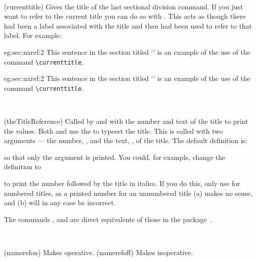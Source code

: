 \begin{syntax}
\cmd{\currenttitle} \\
\end{syntax}
\glossary(currenttitle)%
  {}%
  {Gives the title of the last sectional division command.}
    If you just want to refer to the current title you can do so with
\cmd{\currenttitle}. This acts as though there had been a label associated
with the title and then \cmd{\titleref} had been used to refer to that label.
For example:
\begin{egsource}{eg:sec:nxref:2}
This sentence in the section titled `\currenttitle' is an example of the
use of the command \verb?\currenttitle?.
\end{egsource}

\begin{egresult}{eg:sec:nxref:2}
This sentence in the section titled `\currenttitle' is an example of the
use of the command \verb?\currenttitle?.
\end{egresult}

\begin{syntax}
\cmd{\theTitleReference} \\
\end{syntax}
\glossary(theTitleReference)%
  {}
  {Called by  and  with the number and
   text of the title to print the values.}
Both \cmd{\titleref} and \cmd{\currenttitle} use the \cmd{\theTitleReference}
to typeset the title. This is called with two arguments --- 
the number, , and the text, , of the title. The
default definition is:
\begin{lcode}
\newcommand{\theTitleReference}[2]{#2}
\end{lcode}
so that only the  argument is printed. You could, for example,
change the definition to
\begin{lcode}
\renewcommand{\theTitleReference}[2]{#1\space \textit{#2}}
\end{lcode}
to print the number followed by the title in italics. If you do this, only use
\cmd{\titleref} for numbered titles, as a printed number for an 
unnumbered title (a) makes no sense, and (b) will in any case be 
incorrect.

    The commands \cmd{\titleref}, \cmd{\theTitleReference} and 
\cmd{\currenttitle} are direct equivalents of those in the 
package~\cite{TITLEREF}.

\begin{syntax}
\cmd{\namerefon} \cmd{\namerefoff} \\
\end{syntax}
\glossary(namerefon)%
  {}%
  {Makes  operative.}
\glossary(namerefoff)%
  {}%
  {Makes  inoperative.}

